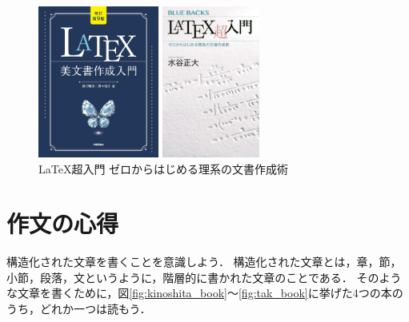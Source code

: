 \documentclass[12pt,twoside]{jsbook}
\begin{document}
\begin{figure}[b]
    \begin{minipage}[t]{0.48\textwidth}
        \centering
        \includegraphics[height=5cm]{images/4297138891}
        \caption{［改訂第9版］\LaTeX 美文書作成入門\cite{2023okumura_book}}
        \label{fig:okumura_latex}
    \end{minipage}
    \begin{minipage}[t]{0.48\textwidth}
        \centering
        \includegraphics[height=5cm]{images/4065204968}
        \caption{\LaTeX 超入門 ゼロからはじめる理系の文書作成術\cite{2020mizutani_book}}
        \label{fig:mizutani_latex}
    \end{minipage}
\end{figure}

\section{作文の心得}

構造化された文章を書くことを意識しよう．
構造化された文章とは，章，節，小節，段落，文というように，階層的に書かれた文章のことである．
そのような文章を書くために，図\ref{fig:kinoshita_book}〜\ref{fig:tak_book}に挙げた4つの本のうち，どれか一つは読もう．
\end{document}
